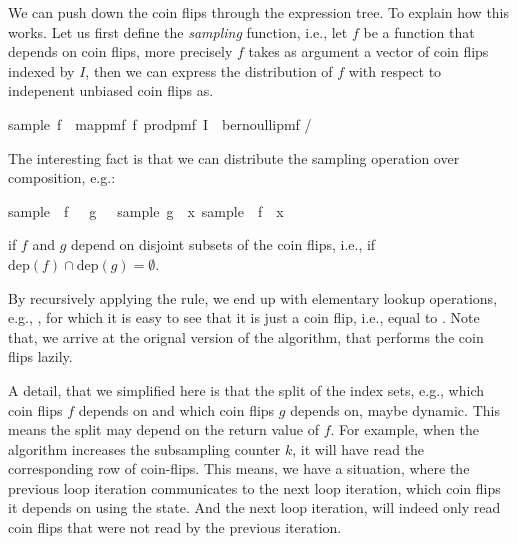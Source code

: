 We can push down the coin flips through the expression tree.
To explain how this works.
Let us first define the \emph{sampling} function, i.e., let $f$ be a function that depends on coin flips, more precisely $f$ takes as argument a vector of coin flips indexed by $I$, then we can express the distribution of $f$ with respect to indepenent unbiased coin flips as.
\begin{isabelle_cm}
  sample\ f\ \isacharequal\ map{\isacharunderscore}pmf\ f\ {\isacharparenleft}prod{\isacharunderscore}pmf\ I\ {\isacharparenleft}\isasymlambda\isacharunderscore\isachardot\ bernoulli{\isacharunderscore}pmf \isacharparenleft{}/\isacharparenright\isacharparenright\isacharparenright
\end{isabelle_cm}
The interesting fact is that we can distribute the sampling operation over composition, e.g.:
\begin{isabelle_cm}
  sample\ \isacharparenleft\isasymlambda\isasymomega\isachardot\ f\ \isasymomega\ \isasymcirc\ g\ \isasymomega{\isacharparenright}\ \isacharequal\ sample\ g\ \isasymbind\ \isacharparenleft{\isasymlambda}x\isachardot\ sample\ \isacharparenleft\isasymlambda\isasymomega\isachardot\ f\ \isasymomega\isachardot\ x\isacharparenright\isacharparenright
\end{isabelle_cm}
if $f$ and $g$ depend on disjoint subsets of the coin flips, i.e., if $\mathrm{dep}(f) \cap \mathrm{dep}(g) = \emptyset$.

By recursively applying the rule, we end up with elementary lookup operations, e.g., , for which it is easy to see that it is just a coin flip, i.e., equal to .
Note that, we arrive at the orignal version of the algorithm, that performs the coin flips lazily.

A detail, that we simplified here is that the split of the index sets, e.g., which coin flips $f$ depends on and which coin flips $g$ depends on, maybe dynamic.
This means the split may depend on the return value of $f$.
For example, when the algorithm increases the subsampling counter $k$, it will have read the corresponding row of coin-flips.
This means, we have a situation, where the previous loop iteration communicates to the next loop iteration, which coin flips it depends on using the state.
And the next loop iteration, will indeed only read coin flips that were not read by the previous iteration.


